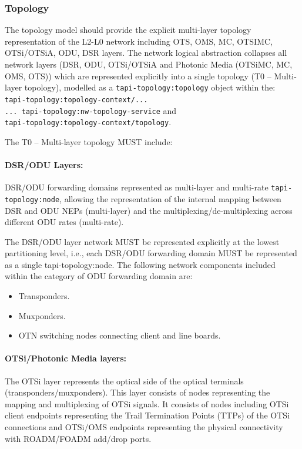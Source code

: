 \documentclass[a4paper,fleqn]{cas-dc}
\begin{document}
\subsubsection{Topology}
\label{subsection:OPTopo}

The topology model should provide the explicit multi-layer topology representation of the L2-L0 network including OTS, OMS, MC, OTSIMC, OTSi/OTSiA, ODU, DSR layers. The network logical abstraction collapses all network layers (DSR, ODU, OTSi/OTSiA and Photonic Media (OTSiMC, MC, OMS, OTS)) which are represented explicitly into a single topology (T0 – Multi-layer topology), modelled as a \texttt{tapi-topology:topology} object within the: \\
\texttt{tapi-topology:topology-context/... \\
... tapi-topology:nw-topology-service} and \\ \texttt{tapi-topology:topology-context/topology}. 

The T0 – Multi-layer topology MUST include:

\paragraph{DSR/ODU Layers:}
DSR/ODU forwarding domains represented as multi-layer and multi-rate \texttt{tapi-topology:node}, allowing the representation of the internal mapping between DSR and ODU NEPs (multi-layer) and the multiplexing/de-multiplexing across different ODU rates (multi-rate). 

The DSR/ODU layer network MUST be represented explicitly at the lowest partitioning level, i.e., each DSR/ODU forwarding domain MUST be represented as a single tapi-topology:node. The following network components included within the category of ODU forwarding domain are:

\begin{itemize}
    \item Transponders.
    \item Muxponders.
    \item OTN switching nodes connecting client and line boards.
\end{itemize}

\paragraph{OTSi/Photonic Media layers:}
The OTSi layer represents the optical side of the optical terminals (transponders/muxponders). This layer consists of nodes representing the mapping and multiplexing of OTSi signals. It consists of nodes including OTSi client endpoints representing the Trail Termination Points (TTPs) of the OTSi connections and OTSi/OMS endpoints representing the physical connectivity with ROADM/FOADM add/drop ports.
\end{document}
